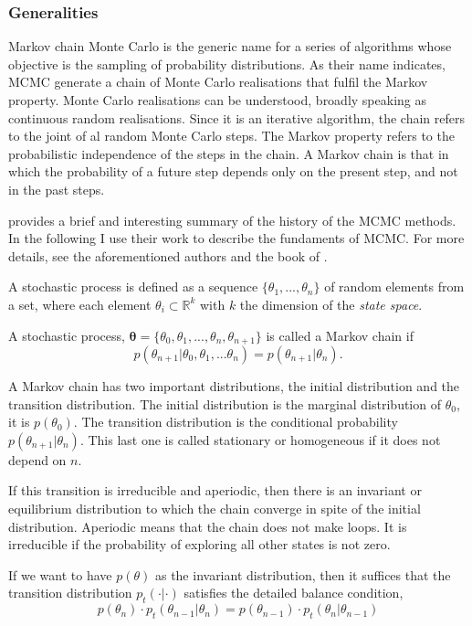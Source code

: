 \subsubsection{Generalities}
Markov chain Monte Carlo is the generic name for a series of algorithms whose objective is the sampling of probability distributions. As their name indicates, MCMC generate a chain of Monte Carlo realisations that fulfil the Markov property. Monte Carlo realisations can be understood, broadly speaking as continuous random realisations. Since it is an iterative algorithm, the chain refers to the joint of al random Monte Carlo steps. The Markov property refers to the probabilistic independence of the steps in the chain. A Markov chain is that in which the probability of a future step depends only on the present step, and not in the past steps.

\citet{Andrieu2003} provides a brief and interesting summary of the history of the MCMC methods. In the following I use their work to describe the fundaments of MCMC. For more details, see the aforementioned authors and the book of \citet{Brooks2011}.

A stochastic process is defined as a sequence  $\{\theta_1,...,\theta_n\}$ of random elements from a set, where each element $\theta_i \subset \mathbb{R}^k$  with $k$ the dimension of the \emph{state space}. 

A stochastic process, $\boldsymbol{\theta}=\{\theta_0,\theta_1,...,\theta_n,\theta_{n+1}\}$ is called a Markov chain if
\begin{equation}
p(\theta_{n+1} | \theta_0,\theta_1,...\theta_n) = p(\theta_{n+1} |\theta_n). \nonumber
\end{equation}

A Markov chain has two important distributions, the initial distribution and the transition distribution. The initial distribution is the marginal distribution of $\theta_0$, it is $p(\theta_0)$. The transition distribution is the conditional probability $p(\theta_{n+1} |\theta_n)$. This last one is called stationary or homogeneous if it does not depend on $n$.

If this transition is irreducible and aperiodic, then there is an invariant or equilibrium distribution to which the chain converge in spite of the initial distribution. Aperiodic means that the chain does not make loops. It is irreducible if the probability of exploring all other states is not zero.

If we want to have $p(\theta)$ as the invariant distribution, then it suffices that the transition distribution $p_t(\cdot | \cdot)$ satisfies the detailed balance condition,
\begin{equation}
p(\theta_{n})\cdot p_t(\theta_{n-1}|\theta_n)=p(\theta_{n-1})\cdot p_t(\theta_n | \theta_{n-1})
\end{equation}

